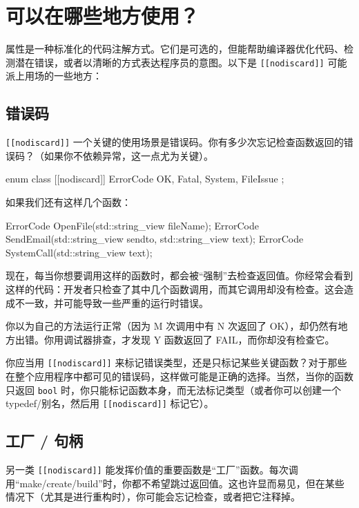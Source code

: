 \section{可以在哪些地方使用？}

属性是一种标准化的代码注解方式。它们是可选的，但能帮助编译器优化代码、检测潜在错误，或者以清晰的方式表达程序员的意图。以下是 \texttt{\texttt{[[nodiscard]]}} 可能派上用场的一些地方：

\subsection{错误码}

\texttt{\texttt{[[nodiscard]]}} 一个关键的使用场景是错误码。你有多少次忘记检查函数返回的错误码？（如果你不依赖异常，这一点尤为关键）。

\begin{codebox}[cpp]
enum class [[nodiscard]] ErrorCode {
OK,
Fatal,
System,
FileIssue
};
\end{codebox}

如果我们还有这样几个函数：

\begin{codebox}[cpp]
ErrorCode OpenFile(std::string_view fileName);
ErrorCode SendEmail(std::string_view sendto,
std::string_view text);
ErrorCode SystemCall(std::string_view text);
\end{codebox}

现在，每当你想要调用这样的函数时，都会被“强制”去检查返回值。你经常会看到这样的代码：开发者只检查了其中几个函数调用，而其它调用却没有检查。这会造成不一致，并可能导致一些严重的运行时错误。

你以为自己的方法运行正常（因为 M 次调用中有 N 次返回了 OK），却仍然有地方出错。你用调试器排查，才发现 Y 函数返回了 FAIL，而你却没有检查它。

你应当用 \texttt{\texttt{[[nodiscard]]}} 来标记错误类型，还是只标记某些关键函数？对于那些在整个应用程序中都可见的错误码，这样做可能是正确的选择。当然，当你的函数只返回 \texttt{bool} 时，你只能标记函数本身，而无法标记类型（或者你可以创建一个 typedef/别名，然后用 \texttt{\texttt{[[nodiscard]]}} 标记它）。

\subsection{工厂 / 句柄}

另一类 \texttt{\texttt{[[nodiscard]]}} 能发挥价值的重要函数是“工厂”函数。每次调用“make/create/build”时，你都不希望跳过返回值。这也许显而易见，但在某些情况下（尤其是进行重构时），你可能会忘记检查，或者把它注释掉。

